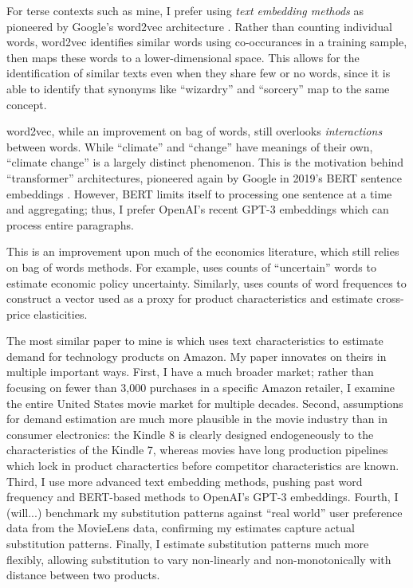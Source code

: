 \documentclass{article}
\begin{document}
For terse contexts such as mine, I prefer using \emph{text embedding methods} as pioneered by Google's word2vec architecture \parencite{mikolov2013}. Rather than counting individual words, word2vec identifies similar words using co-occurances in a training sample, then maps these words to a lower-dimensional space. This allows for the identification of similar texts even when they share few or no words, since it is able to identify that synonyms like ``wizardry'' and ``sorcery'' map to the same concept.

word2vec, while an improvement on bag of words, still overlooks \emph{interactions} between words. While ``climate'' and ``change'' have meanings of their own, ``climate change'' is a largely distinct phenomenon. This is the motivation behind ``transformer'' architectures, pioneered again by Google in 2019's BERT sentence embeddings \parencite{devlin2019}. However, BERT limits itself to processing one sentence at a time and aggregating; thus, I prefer OpenAI's recent GPT-3 embeddings which can process entire paragraphs.

This is an improvement upon much of the economics literature, which still relies on bag of words methods. For example, \textcite{baker2016QJE} uses counts of ``uncertain'' words to estimate economic policy uncertainty. Similarly, \textcite{ederer2022} uses counts of word frequences to construct a vector used as a proxy for product characteristics and estimate cross-price elasticities.

The most similar paper to mine is \textcite{compiani2023} which uses text characteristics to estimate demand for technology products on Amazon. My paper innovates on theirs in multiple important ways. First, I have a much broader market; rather than focusing on fewer than 3,000 purchases in a specific Amazon retailer, I examine the entire United States movie market for multiple decades. Second, assumptions for demand estimation are much more plausible in the movie industry than in consumer electronics: the Kindle 8 is clearly designed endogeneously to the characteristics of the Kindle 7, whereas movies have long production pipelines which lock in product charactertics before competitor characteristics are known. Third, I use more advanced text embedding methods, pushing past word frequency and BERT-based methods to OpenAI's GPT-3 embeddings. Fourth, I (will...) benchmark my substitution patterns against ``real world'' user preference data from the MovieLens data, confirming my estimates capture actual substitution patterns. Finally, I estimate substitution patterns much more flexibly, allowing substitution to vary non-linearly and non-monotonically with distance between two products.
\end{document}
